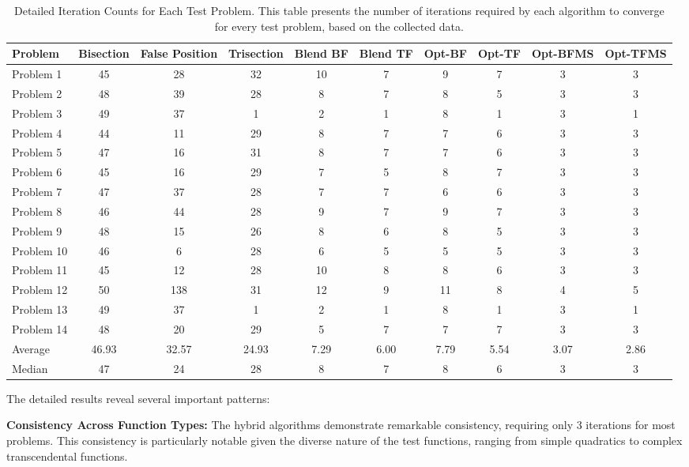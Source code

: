 \documentclass[amsmath, amssymb, aps]{revtex4-2}
\begin{document}
\begin{table}[H]
\centering
\caption{Detailed Iteration Counts for Each Test Problem. This table presents the number of iterations required by each algorithm to converge for every test problem, based on the collected data.}
\label{tab:detailed_results}
\begin{tabular}{lccccccccc}
\toprule
Problem & Bisection & False Position & Trisection & Blend BF & Blend TF & Opt-BF & Opt-TF & Opt-BFMS & Opt-TFMS \\
\midrule
Problem 1  & 45 & 28 & 32 & 10 & 7 & 9 & 7 & 3 & 3 \\
Problem 2  & 48 & 39 & 28 & 8  & 7 & 8 & 5 & 3 & 3 \\
Problem 3  & 49 & 37 & 1  & 2  & 1 & 8 & 1 & 3 & 1 \\
Problem 4  & 44 & 11 & 29 & 8  & 7 & 7 & 6 & 3 & 3 \\
Problem 5  & 47 & 16 & 31 & 8  & 7 & 7 & 6 & 3 & 3 \\
Problem 6  & 45 & 16 & 29 & 7  & 5 & 8 & 7 & 3 & 3 \\
Problem 7  & 47 & 37 & 28 & 7  & 7 & 6 & 6 & 3 & 3 \\
Problem 8  & 46 & 44 & 28 & 9  & 7 & 9 & 7 & 3 & 3 \\
Problem 9  & 48 & 15 & 26 & 8  & 6 & 8 & 5 & 3 & 3 \\
Problem 10 & 46 & 6  & 28 & 6  & 5 & 5 & 5 & 3 & 3 \\
Problem 11 & 45 & 12 & 28 & 10 & 8 & 8 & 6 & 3 & 3 \\
Problem 12 & 50 & 138& 31 & 12 & 9 & 11& 8 & 4 & 5 \\
Problem 13 & 49 & 37 & 1  & 2  & 1 & 8 & 1 & 3 & 1 \\
Problem 14 & 48 & 20 & 29 & 5  & 7 & 7 & 7 & 3 & 3 \\
\midrule
Average   & 46.93 & 32.57 & 24.93 & 7.29 & 6.00 & 7.79 & 5.54 & 3.07 & 2.86 \\
Median    & 47    & 24    & 28    & 8    & 7    & 8    & 6    & 3    & 3    \\
\bottomrule
\end{tabular}
\end{table}

The detailed results reveal several important patterns:

\textbf{Consistency Across Function Types:} The hybrid algorithms demonstrate remarkable consistency, requiring only 3 iterations for most problems. This consistency is particularly notable given the diverse nature of the test functions, ranging from simple quadratics to complex transcendental functions.
\end{document}
